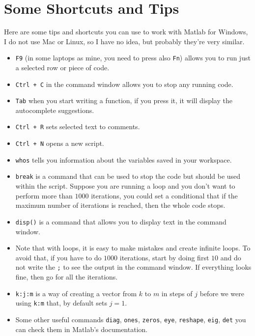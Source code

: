 \documentclass[a4paper,11pt]{article}
\begin{document}
\section{Some Shortcuts and Tips}

Here are some tips and shortcuts you can use to work with Matlab for Windows, I do not use Mac or Linux, so I have no idea, but probably they're very similar.

\begin{itemize}
	\item \verb;F9; (in some laptops as mine, you need to press also \verb;Fn;) allows you to run just a selected row or piece of code.
	\item \verb;Ctrl + C; in the command window allows you to stop any running code.
	\item \verb;Tab; when you start writing a function, if you press it, it will display the autocomplete suggestions.
	\item \verb;Ctrl + R; sets selected text to comments.
	\item \verb;Ctrl + N; opens a new script.
	\item \verb;whos; tells you information about the variables saved in your workspace.
	\item \verb;break; is a command that can be used to stop the code but should be used within the script. Suppose you are running a loop and you don't want to perform more than $1000$ iterations, you could set a conditional that if the maximum number of iterations is reached, then the whole code stops.
	\item \verb;disp(); is a command that allows you to display text in the command window.
	\item Note that with loops, it is easy to make mistakes and create infinite loops. To avoid that, if you have to do $1000$ iterations, start by doing first $10$ and do not write the \verb+;+ to see the output in the command window. If everything looks fine, then go for all the iterations.
	\item \verb;k:j:m; is a way of creating a vector from $k$ to $m$ in steps of $j$ before we were using \verb;k:m; that, by default sets $j=1$.
	\item Some other useful commands \verb;diag;, \verb;ones;, \verb;zeros;, \verb;eye;, \verb;reshape;, \verb;eig;, \verb;det; you can check them in Matlab's documentation.
\end{itemize}
\end{document}
